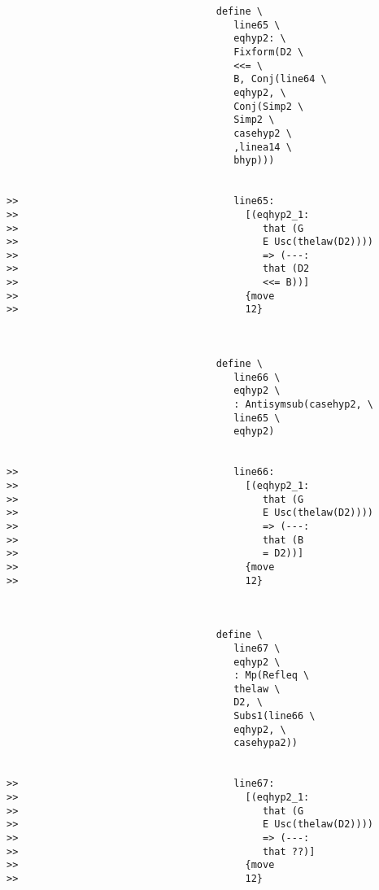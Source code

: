 \documentclass[12pt]{article}
\begin{document}
\begin{verbatim}
                                    define \
                                       line65 \
                                       eqhyp2: \
                                       Fixform(D2 \
                                       <<= \
                                       B, Conj(line64 \
                                       eqhyp2, \
                                       Conj(Simp2 \
                                       Simp2 \
                                       casehyp2 \
                                       ,linea14 \
                                       bhyp)))


>>                                     line65:
>>                                       [(eqhyp2_1:
>>                                          that (G
>>                                          E Usc(thelaw(D2))))
>>                                          => (---:
>>                                          that (D2
>>                                          <<= B))]
>>                                       {move
>>                                       12}



                                    define \
                                       line66 \
                                       eqhyp2 \
                                       : Antisymsub(casehyp2, \
                                       line65 \
                                       eqhyp2)


>>                                     line66:
>>                                       [(eqhyp2_1:
>>                                          that (G
>>                                          E Usc(thelaw(D2))))
>>                                          => (---:
>>                                          that (B
>>                                          = D2))]
>>                                       {move
>>                                       12}



                                    define \
                                       line67 \
                                       eqhyp2 \
                                       : Mp(Refleq \
                                       thelaw \
                                       D2, \
                                       Subs1(line66 \
                                       eqhyp2, \
                                       casehypa2))


>>                                     line67:
>>                                       [(eqhyp2_1:
>>                                          that (G
>>                                          E Usc(thelaw(D2))))
>>                                          => (---:
>>                                          that ??)]
>>                                       {move
>>                                       12}




\end{verbatim}
\end{document}
